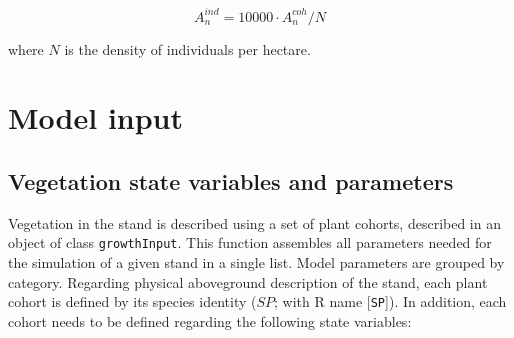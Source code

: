 \documentclass[]{book}
\begin{document}
\begin{equation}
A_{n}^{ind} = 10000 \cdot A_n^{coh} / N
\end{equation}

where \(N\) is the density of individuals per hectare.

\section{Model input}\label{model-input-2}

\subsection{Vegetation state variables and
parameters}\label{vegetation-state-variables-and-parameters}

Vegetation in the stand is described using a set of plant cohorts,
described in an object of class \texttt{growthInput}. This function
assembles all parameters needed for the simulation of a given stand in a
single list. Model parameters are grouped by category. Regarding
physical aboveground description of the stand, each plant cohort is
defined by its species identity (\(SP\); with R name {[}\texttt{SP}{]}).
In addition, each cohort needs to be defined regarding the following
state variables:
\end{document}
